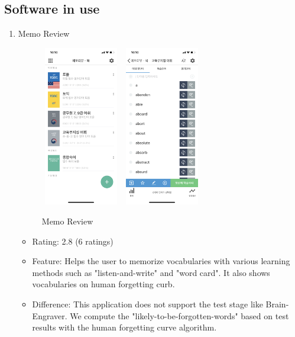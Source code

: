 \documentclass[conference]{IEEEtran}
\begin{document}
\subsection{Software in use}
\begin{enumerate}
    \item Memo Review
        \begin{figure}[h]
            \centering
            \hfill
            \includegraphics[width=3.5cm, height=7cm]{images/memoreview1.PNG}
            \hfill
            \includegraphics[width=3.5cm, height=7cm]{images/memoreview2.PNG}
            \hfill
            \caption{Memo Review}
        \end{figure}
        \begin{itemize}
            \item Rating: 2.8 (6 ratings)
            \item Feature: Helps the user to memorize vocabularies with various learning methods such as "listen-and-write" and "word card". It also shows vocabularies on human forgetting curb.
            \item Difference: This application does not support the test stage like Brain-Engraver. We compute the "likely-to-be-forgotten-words" based on test results with the human forgetting curve algorithm.

\end{itemize}
\end{enumerate}
\end{document}
